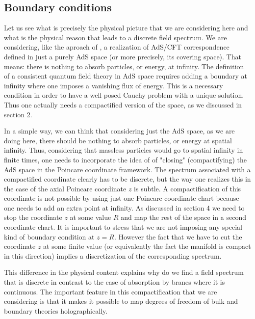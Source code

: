 \documentclass[a4paper,12pt]{article}
\begin{document}
\subsection{Boundary conditions}

Let us see what is precisely the physical picture that we are considering here
and what is the physical reason that leads to a discrete field spectrum.
We are considering, like the aproach of \cite{Wi},
a realization of AdS/CFT correspondence  defined in just 
a purely AdS space (or more precisely, its covering space).
That means:  there is nothing to absorb particles, or energy, at infinity.
The definition of a consistent quantum field theory in AdS space
requires adding a boundary at  infinity where  one imposes a
vanishing flux of energy.  This is a necessary condition 
in order to have a well posed Cauchy problem with a unique solution\cite{QAdS1,QAdS2}.
Thus one actually needs a compactified
version of the space, as we discussed  in section 2.

In a simple way, we can think that considering just the AdS space, as we are
doing here,  there should be  nothing to absorb particles, or energy 
at spatial infinity. Thus, considering that massless particles would go to spatial
infinity in finite times, one needs to incorporate the idea of \cite{QAdS1,QAdS2} 
of "closing" (compactifying) the AdS space in the Poincare coordinate framework.
The spectrum associated with a compactified coordinate clearly has to be discrete, but 
the way one realizes this in the case of the axial Poincare coordinate $z$ 
is subtle. A compactification of this coordinate is not possible by using 
just one Poincare coordinate chart because one needs to add an extra point at infinity.
As discussed in section 4 we need to stop the coordinate $z$ at some value $R$ and 
map the rest of the space in a second coordinate chart.
It is important to stress that we are not imposing any special
kind of boundary condition at $z=R$. However the fact that we have to cut the coordinate
$z$ at some finite value (or equivalently the fact the manifold is compact 
in this direction) implies a discretization of the corresponding spectrum.



This difference in the physical content explains why do we find a 
field spectrum that is discrete in contrast to the case of 
absorption by branes where it is continuous. 
The important feature in this compactification that we are considering is that it 
makes it possible to map degrees of freedom of bulk and boundary theories
holographically\cite{BB}. 
\end{document}
